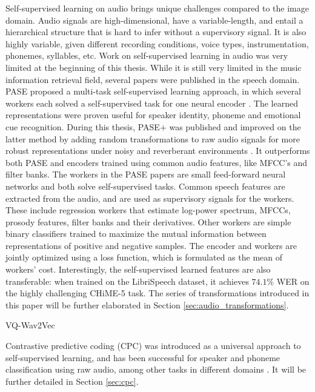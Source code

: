 Self-supervised learning on audio brings unique challenges compared to the image domain. Audio signals are high-dimensional, have a variable-length, and entail a hierarchical structure that is hard to infer without a supervisory signal. It is also highly variable, given different recording conditions, voice types, instrumentation, phonemes, syllables, etc. Work on self-supervised learning in audio was very limited at the beginning of this thesis. While it is still very limited in the music information retrieval field, several papers were published in the speech domain. PASE proposed a multi-task self-supervised learning approach, in which several workers each solved a self-supervised task for one neural encoder \cite{Pascual2019}. The learned representations were proven useful for speaker identity, phoneme and emotional cue recognition. During this thesis, PASE$+$ was published and improved on the latter method by adding random transformations to raw audio signals for more robust representations under noisy and reverberant environments \cite{Ravanelli2020}. It outperforms both PASE and encoders trained using common audio features, like MFCC's and filter banks. The workers in the PASE papers are small feed-forward neural networks and both solve self-supervised tasks. Common speech features are extracted from the audio, and are used as supervisory signals for the workers. These include regression workers that estimate log-power spectrum, MFCCs, prosody features, filter banks and their derivatives. Other workers are simple binary classifiers trained to maximize the mutual information between representations of positive and negative samples. The encoder and workers are jointly optimized using a loss function, which is formulated as the mean of workers' cost. Interestingly, the self-supervised learned features are also transferable: when trained on the LibriSpeech dataset, it achieves $74.1\%$ WER on the highly challenging CHiME-5 task\cite{barker2018fifth}. The series of transformations introduced in this paper will be further elaborated in Section \ref{sec:audio_transformations}.

VQ-Wav2Vec

Contrastive predictive coding (CPC) was introduced as a universal approach to self-supervised learning, and has been successful for speaker and phoneme classification using raw audio, among other tasks in different domains \cite{oord_representation_2019}. It will be further detailed in Section \ref{sec:cpc}.

